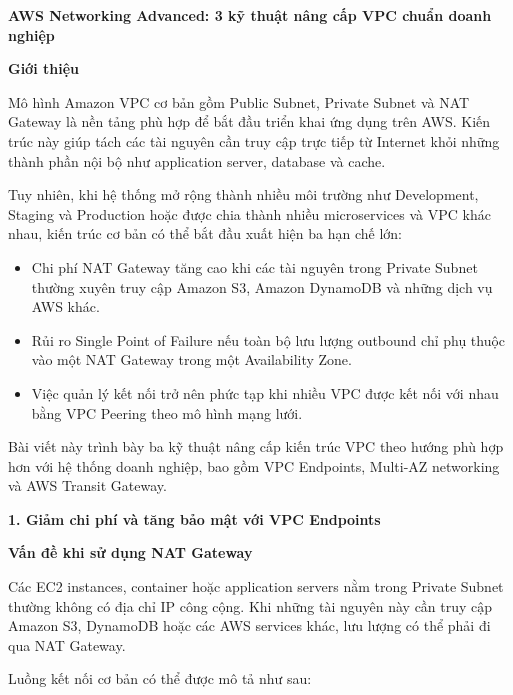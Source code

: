 \vspace{0.5em}\noindent\textbf{AWS Networking Advanced: 3 kỹ thuật nâng cấp VPC chuẩn doanh
nghiệp}\par

\vspace{0.5em}\noindent\textbf{Giới thiệu}\par

Mô hình Amazon VPC cơ bản gồm Public Subnet, Private Subnet và NAT
Gateway là nền tảng phù hợp để bắt đầu triển khai ứng dụng trên AWS.
Kiến trúc này giúp tách các tài nguyên cần truy cập trực tiếp từ
Internet khỏi những thành phần nội bộ như application server, database
và cache.

Tuy nhiên, khi hệ thống mở rộng thành nhiều môi trường như Development,
Staging và Production hoặc được chia thành nhiều microservices và VPC
khác nhau, kiến trúc cơ bản có thể bắt đầu xuất hiện ba hạn chế lớn:

\begin{itemize}
\tightlist
\item
  Chi phí NAT Gateway tăng cao khi các tài nguyên trong Private Subnet
  thường xuyên truy cập Amazon S3, Amazon DynamoDB và những dịch vụ AWS
  khác.
\item
  Rủi ro Single Point of Failure nếu toàn bộ lưu lượng outbound chỉ phụ
  thuộc vào một NAT Gateway trong một Availability Zone.
\item
  Việc quản lý kết nối trở nên phức tạp khi nhiều VPC được kết nối với
  nhau bằng VPC Peering theo mô hình mạng lưới.
\end{itemize}

Bài viết này trình bày ba kỹ thuật nâng cấp kiến trúc VPC theo hướng phù
hợp hơn với hệ thống doanh nghiệp, bao gồm VPC Endpoints, Multi-AZ
networking và AWS Transit Gateway.

\vspace{0.5em}\noindent\textbf{1. Giảm chi phí và tăng bảo mật với VPC
Endpoints}\par

\vspace{0.5em}\noindent\textbf{Vấn đề khi sử dụng NAT
Gateway}\par

Các EC2 instances, container hoặc application servers nằm trong Private
Subnet thường không có địa chỉ IP công cộng. Khi những tài nguyên này
cần truy cập Amazon S3, DynamoDB hoặc các AWS services khác, lưu lượng
có thể phải đi qua NAT Gateway.

Luồng kết nối cơ bản có thể được mô tả như sau:

